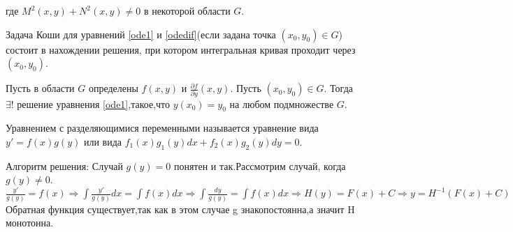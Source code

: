 \documentclass[document.tex]{subfiles}
\begin{document}
где $M^2(x,y)+N^2(x,y)\neq0$ в некоторой области $G$.
\begin{definition}
Задача Коши для уравнений \ref{ode1} и \ref{odedif}(если задана точка $(x_0,y_0)\in G$) состоит в нахождении решения, при котором интегральная кривая проходит через $(x_0,y_0)$.
\end{definition}
\begin{theorem}
Пусть в области $G$ определены $f(x,y)$ и $\frac{\partial f}{\partial y} (x,y)$. Пусть $(x_0,y_0)\in G$. Тогда
$\exists!$ решение уравнения \ref{ode1},такое,что $y(x_0)=y_0$ на любом подмножестве $G$.
\end{theorem}
\begin{definition}
Уравнением с разделяющимися переменными называется уравнение вида $y'=f(x)g(y)$ или вида $f_1(x)g_1(y)dx+f_2(x)g_2(y)dy=0$.
\end{definition}
Алгоритм решения:
Случай $g(y) = 0$ понятен и так.Рассмотрим случай, когда $g(y)\neq0$.
$\frac{y'}{g(y)}=f(x) \Rightarrow \int \frac{y'}{g(y)}dx=\int f(x)dx \Rightarrow \int \frac{dy}{g(y)}=\int f(x)dx \Rightarrow H(y)=F(x)+C \Rightarrow y=H^{-1}(F(x)+C)$
Обратная функция существует,так как в этом случае g знакопостоянна,а значит H монотонна.
\end{document}

